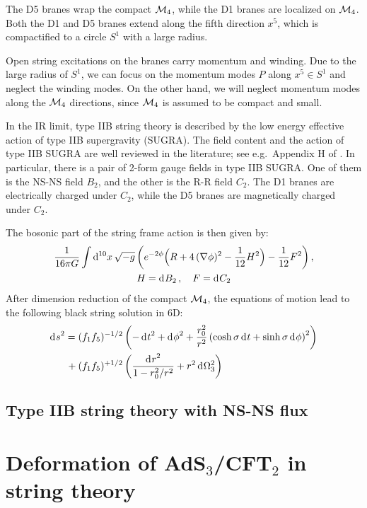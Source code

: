 \documentclass[11pt,a4paper]{article}
\newcommand{\ads}[1]{AdS\ensuremath{_{#1}}}
\newcommand{\cft}[1]{CFT\ensuremath{_{#1}}}
\begin{document}
	The D5 branes wrap the compact $\mcal{M}_4$, while the D1 branes are localized on $\mcal{M}_4$. Both the D1 and D5 branes extend along the fifth direction $x^5$, which is compactified to a circle $S^1$ with a large radius. 
	
	Open string excitations on the branes carry momentum and winding. Due to the large radius of $S^1$, we can focus on the momentum modes $P$ along $x^5 \in S^1$ and neglect the winding modes. On the other hand, we will neglect momentum modes along the $\mcal{M}_4$ directions, since $\mcal{M}_4$ is assumed to be compact and small. 
	
	In the IR limit, type IIB string theory is described by the low energy effective action of type IIB supergravity (SUGRA). The field content and the action of type IIB SUGRA are well reviewed in the literature; see e.g.\ Appendix H of \cite{Kiritsis:1997hj}. In particular, there is a pair of 2-form gauge fields in type IIB SUGRA. One of them is the NS-NS field $B_2$, and the other is the R-R field $C_2$. 
	The D1 branes are electrically charged under $C_2$, while the D5 branes are magnetically charged under $C_2$. 
	
	The bosonic part of the string frame action is then given by:
	\begin{gather}
		\frac{1}{16\pi G}
		\int \dd[10]{x} \sqrt{-g}
			\pqty{
				e^{-2\phi} \Big(
					R + 4\,(\nabla\phi)^2
					- \frac{1}{12} H^2
				\Big)
				- \frac{1}{12} F^2
			},
	\\
		H = \dd{B_2},\quad
		F = \dd{C_2}
	\end{gather}
	After dimension reduction of the compact $\mcal{M}_4$, the equations of motion lead to the following black string solution in 6D:
	\begin{equation}
	\begin{aligned}
		\dd{s}^2
		= {} & (f_1 f_5)^{-1/2} \pqty{
				-\dd{t}^2 + \dd{\phi}^2
				+ \frac{r_0^2}{r^2} \pqty{
					\cosh\sigma \dd{t}
					+ \sinh\sigma \dd{\phi}
				}^2
			} \\
		{} + {} & (f_1 f_5)^{+1/2} \pqty{
				\frac{\dd{r}^2}{1 - r_0^2 / r^2}
				+ r^2 \dd{\Omega_3^2}
			}
	\end{aligned}
	\end{equation}
	
	
	
\subsection{Type IIB string theory with NS-NS flux}
	
	
	
	
\section{Deformation of \ads{3}/\cft{2} in string theory}


\pagebreak
 

\end{document}
